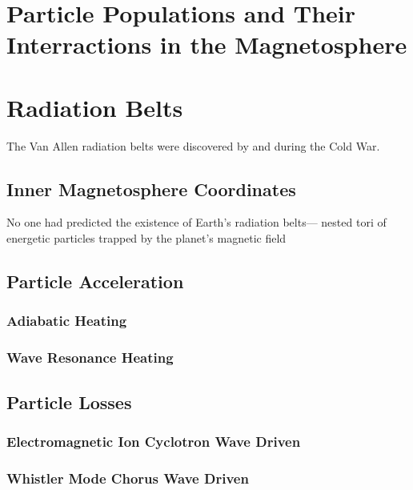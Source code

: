 \section{Particle Populations and Their Interractions in the Magnetosphere}\label{ntro:particle_populations}

\section{Radiation Belts}\label{Intro:radiation_belt}
The Van Allen radiation belts were discovered by \citet{Allen1959} and \citet{Vernov1960} during the Cold War.

\subsection{Inner Magnetosphere Coordinates}\label{Intro:coords}


 No one had predicted the
existence of Earth’s radiation belts—
nested tori of energetic particles trapped
by the planet’s magnetic field

\subsection{Particle Acceleration}\label{Intro:acceleration}

\subsubsection{Adiabatic Heating}\label{Intro:adiabatic_heating}

\subsubsection{Wave Resonance Heating}\label{Intro:wave_heating}

\subsection{Particle Losses}\label{Intro:acceleration}

\subsubsection{Electromagnetic Ion Cyclotron Wave Driven}\label{Intro:emic_scattering}

\subsubsection{Whistler Mode Chorus Wave Driven}\label{Intro:chorus_scattering}

